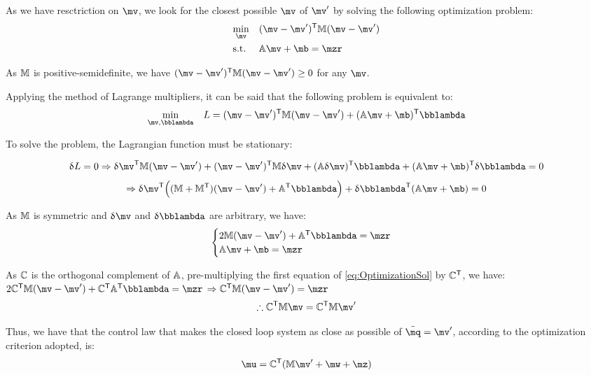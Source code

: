 As we have resctriction on $\mv$, we look for the closest possible $\mv$ of $\mv'$ 
by solving the following optimization problem:
\begin{equation} \label{eq:Optimization}
\begin{aligned}
& \underset{\mv}{\min}
& & (\mv - \mv')^\msT \mM (\mv - \mv') \\
& \text{s.t.}
& & \mA \mv + \mb = \mzr
\end{aligned}
\end{equation}

As $\mathbb{M}$ is positive-semidefinite, we have $(\mv - \mv')^\msT \mM (\mv - \mv') \geq 0 $ for any $\mv$.

Applying the method of Lagrange multipliers, it can be said that the following problem is equivalent to:
\begin{equation}
\begin{aligned}
& \underset{\mv, \mlambda}{\min}
& & L = (\mv - \mv')^\msT \mM (\mv - \mv') + (\mA \mv + \mb)^\msT \mlambda \\
\end{aligned}
\end{equation}

To solve the problem, the Lagrangian function must be stationary:

$$ \dl L = 0 \Rightarrow \dl \mv^\msT \mM (\mv - \mv') + (\mv - \mv')^\msT \mM \dl \mv + (\mA \dl \mv)^\msT \mlambda + (\mA \mv + \mb)^\msT \dl \mlambda = 0 $$
$$ \Rightarrow \dl \mv^\msT \Big( (\mM + \mM^\msT)(\mv - \mv') + \mA^\msT \mlambda \Big) + \dl \mlambda^\msT (\mA \mv + \mb) = 0 $$

As $\mathbb{M}$ is symmetric and $\dl \mv$ and $\dl \mlambda$ are arbitrary, we have:
\begin{equation} \label{eq:OptimizationSol}
\begin{cases}
2 \mM (\mv - \mv') + \mA^\msT \mlambda = \mzr \\
\mA \mv + \mb = \mzr
\end{cases}
\end{equation}

As $\mathbb{C}$ is the orthogonal complement of $\mathbb{A}$, pre-multiplying the first equation of \eqref{eq:OptimizationSol} by $\mathbb{C}^{\mathsf{T}}$, we have: \\

$ 2 \mC^\msT \mM (\mv - \mv') + \mC^\msT \mA^\msT \mlambda = \mzr $
$ \Rightarrow  \mC^\msT \mM (\mv - \mv')  = \mzr $
\begin{equation} \label{eq:OptimizationSol2}
\therefore \mC^\msT \mM \mv  = \mC^\msT \mM  \mv'
\end{equation}

Thus, we have that the control law that makes the closed loop system as close as possible of $\ddot{\mq} = \mv'$, 
according to the optimization criterion adopted, is:
\begin{equation} \label{eq:ControlLawFinal}
\mu = \mC^\msT ( \mM \mv' + \mw + \mz )
\end{equation}